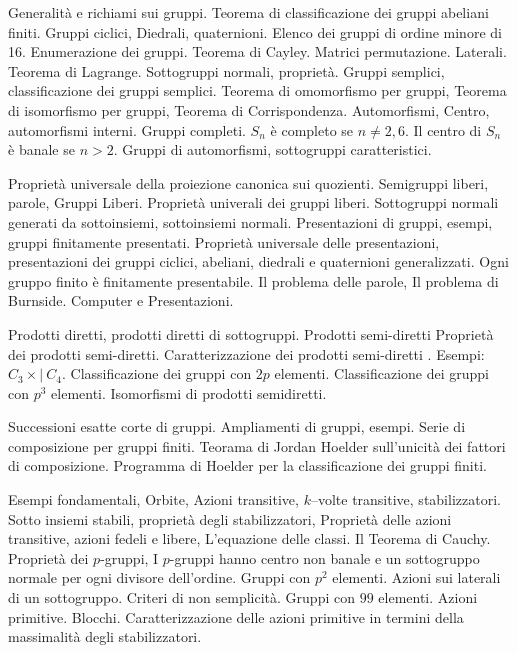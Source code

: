 
\def\abbrcorso{AL9}
\def\titolocorso{Introduzione alla Teoria dei Gruppi}
\def\sottotitolo{http://www.mat.uniroma3.it/users/pappa/CORSI/AL9$_-$06$_-$07/AL9.htm}
\def\docente{Prof. Francesco Pappalardi}
\def\crediti{6}
\def\semestre{II}
\def\esoneri{0}
\def\scrittofinale{0}
\def\oralefinale{1}
\def\altreprove{1}
\Intestazione {}  Generalit\`a e richiami sui gruppi. Teorema di classificazione dei gruppi abeliani finiti. Gruppi ciclici, Diedrali, quaternioni. Elenco dei gruppi di ordine minore di 16. Enumerazione dei gruppi. Teorema di Cayley. Matrici permutazione. Laterali. Teorema di Lagrange. Sottogruppi normali, propriet\`a. Gruppi semplici, classificazione dei gruppi semplici. Teorema di omomorfismo per gruppi, Teorema di isomorfismo per gruppi, Teorema di Corrispondenza. Automorfismi, Centro, automorfismi interni. Gruppi completi. $S_n$ \`e completo se $n\neq2,6$. Il centro di $S_n$ \`e banale se $n>2$. Gruppi di automorfismi, sottogruppi caratteristici.

Propriet\`a universale della proiezione canonica sui quozienti. Semigruppi liberi, parole, Gruppi Liberi. Propriet\`a univerali dei gruppi liberi. Sottogruppi normali generati da sottoinsiemi, sottoinsiemi normali. Presentazioni di gruppi, esempi, gruppi finitamente presentati.
Propriet\`a universale delle presentazioni, presentazioni dei gruppi ciclici, abeliani, diedrali e quaternioni generalizzati. Ogni gruppo finito \`e finitamente presentabile. Il problema delle parole, Il problema di Burnside. Computer e Presentazioni.

 Prodotti diretti, prodotti diretti di sottogruppi.  Prodotti semi-diretti Propriet\`a dei prodotti semi-diretti. Caratterizzazione dei prodotti semi-diretti . Esempi: $C_3\times\!\!\!\!|\ C_4$.
Classificazione dei gruppi con $2p$ elementi. Classificazione dei gruppi con $p^3$ elementi. Isomorfismi di prodotti semidiretti.

 Successioni esatte corte di gruppi.
Ampliamenti di gruppi, esempi. Serie di composizione per gruppi finiti. Teorama di Jordan Hoelder sull'unicit\`a dei fattori di composizione. Programma di Hoelder per la classificazione dei gruppi finiti.


 Esempi fondamentali, Orbite, Azioni transitive, $k$--volte transitive, stabilizzatori. Sotto insiemi stabili, propriet\`a degli stabilizzatori, Propriet\`a delle azioni transitive, azioni fedeli e libere, L'equazione delle classi. Il Teorema di Cauchy. Propriet\`a dei $p$-gruppi, I $p$-gruppi hanno centro non banale e un sottogruppo normale per ogni divisore dell'ordine. Gruppi con $p^2$ elementi. Azioni sui laterali di un sottogruppo. Criteri di non semplicit\`a. Gruppi con $99$ elementi. Azioni primitive. Blocchi. Caratterizzazione delle azioni primitive in termini della massimalit\`a degli stabilizzatori.

